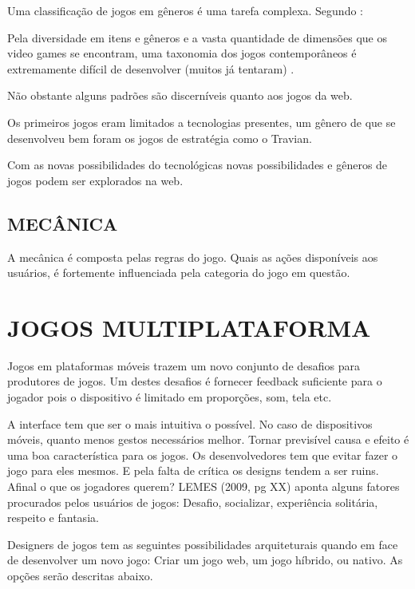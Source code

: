\documentclass[
12pt,
a4paper,
portuges,
draft
]{report}
\renewenvironment{quote}
               {\list{}{\rightmargin\leftmargin}%
                \item\relax\fontsize{10}{12}}
               {\endlist}
\begin{document}
Uma classificação de jogos em gêneros é uma tarefa complexa. Segundo \autocite{gamebenefits}:

\begin{quote}
Pela diversidade  em itens e gêneros e a vasta quantidade de dimensões que os video games se encontram, uma taxonomia dos jogos contemporâneos é extremamente difícil de desenvolver (muitos já tentaram) .
\end{quote}


Não obstante alguns padrões são discerníveis quanto aos jogos da web.


Os primeiros jogos eram limitados a tecnologias presentes, um gênero de que se desenvolveu bem foram os jogos
de estratégia como o Travian.

Com as novas possibilidades do tecnológicas novas possibilidades e gêneros de jogos podem ser explorados na web.

\subsection{MECÂNICA}

A mecânica é composta pelas regras do jogo. Quais as ações
disponíveis aos usuários, é fortemente influenciada pela categoria do
jogo em questão.

\section{JOGOS MULTIPLATAFORMA}

Jogos em plataformas móveis trazem um novo conjunto de desafios para
produtores de jogos. Um destes desafios é fornecer feedback suficiente
para o jogador pois o dispositivo é limitado em proporções, som, tela
etc.

A interface tem que ser o mais intuitiva o possível. No caso de
dispositivos móveis, quanto menos gestos necessários melhor. Tornar
previsível causa e efeito é uma boa característica para os jogos.
Os desenvolvedores tem que evitar fazer o jogo para eles mesmos.
E pela falta de crítica os designs tendem a ser ruins. Afinal o
que os jogadores querem? LEMES (2009, pg XX) aponta alguns fatores procurados
pelos usuários de jogos: Desafio, socializar, experiência solitária,
respeito e fantasia.

Designers de jogos tem as seguintes possibilidades arquiteturais
quando em face de desenvolver um novo jogo: Criar um jogo web,
um jogo híbrido, ou nativo. As opções serão descritas abaixo.
\end{document}
